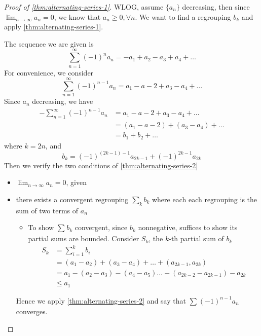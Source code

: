 \begin{proof}[Proof of \ref{thm:alternating-series-1}]
    WLOG, assume $\{ a_n \} $ decreasing, 
    then since $\lim_{n \to \infty}a_n = 0$,
    we know that $a_n \geq 0, \forall n$.
    We want to find a regrouping $b_k$ and apply 
    \ref{thm:alternating-series-1}.
    \medskip

    The sequence we are given is 
    \[
        \sum\limits_{n=1}^{\infty} (-1)^{n}a_n
        = - a_1 +a_2 - a_3 + a_4 + \hdots
    \]
    For convenience, we consider 
    \[
        \sum\limits_{n = 1}^{\infty} (-1)^{n-1} a_n
        = a_1 - a-2 + a_3 - a_4 + \hdots
    \]
    Since $a_n$ decreasing, we have
    \begin{align*}
        - \sum\limits_{n = 1}^{\infty} (-1)^{n-1} a_n
        &= a_1 - a-2 + a_3 - a_4 + \hdots \\
        &= (a_1 - a-2) + (a_3 - a_4) + \hdots \\
        &= b_1 + b_2 + \hdots
    \end{align*}
    where $k = 2n$, and
    \[
        b_{k} = (-1)^{(2k-1)-1}a_{2k-1} + (-1)^{2k-1}a_{2k}
    \] 
    Then we verify the two conditions of \ref{thm:alternating-series-2}
    \begin{itemize}
        \item $\lim_{n \to \infty}a_n = 0$, given 
        \item there exists a convergent regrouping $\sum\limits_{k}^{} b_k$
        where each each regrouping is the sum of two terms of $a_n$
        \begin{itemize}
            \item To show $\sum\limits_{}^{} b_k$ convergent, since $b_k$ 
            nonnegative, suffices to show its partial sums are bounded.
            Consider $S_k$, the $k$-th partial sum of $b_k$
        \begin{align*}
            S_k &= \sum\limits_{i = 1}^{k}  b_i \\
            &= (a_1 - a_2) + (a_3 - a_4) + \hdots + (a_{2k-1}, a_{2k}) \\
            &= a_1 - (a_2 - a_3) - (a_4 - a_5) \hdots - (a_{2k-2}- a_{2k-1}) 
            - a_{2k} \\
            & \leq a_1
        \end{align*}
        \end{itemize} 
        Hence we apply \ref{thm:alternating-series-2} and say that 
        $\sum\limits_{}^{} (-1)^{n-1}a_n$ converges.
    \end{itemize} 
\end{proof}

